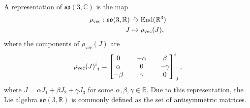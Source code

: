 \begin{example}
\begin{enumerate}[label=(\alph*)]
            A representation of \(\mathfrak{so}(3,\mathbb{C})\) is the map
            \begin{align*}
                \rho_{\mathrm{vec}} : \mathfrak{so}(3,\mathbb{R}) &\mathrel{\tilde{\to}} \operatorname{End}(\mathbb{R}^3)\\
                                                                J &\mapsto \rho_{\mathrm{vec}}(J),
            \end{align*}
            where the components of \(\rho_{\mathrm{vec}}(J)\) are
            \begin{equation*}
                \rho_{\mathrm{vec}}(J)\indices{^i_j} = \begin{bmatrix}
                    0 && -\alpha && \beta\\
                    \alpha && 0 && -\gamma\\
                    -\beta && \gamma && 0\\
                \end{bmatrix}\indices{^i_j},
            \end{equation*}
            where \(J = \alpha J_1 + \beta J_2 + \gamma J_3\) for some \(\alpha,\beta,\gamma \in \mathbb{R}\). Due to this representation, the Lie algebra \(\mathfrak{so}(3,\mathbb{R})\) is commonly defined as the set of antisymmetric matrices.


\end{enumerate}
\end{example}

